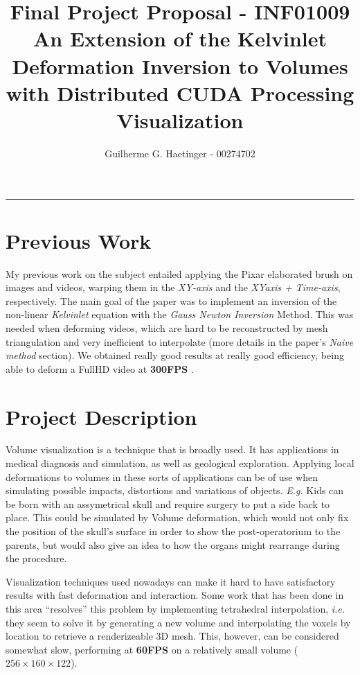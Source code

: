 \documentclass[11pt]{article}
\title{ Final Project Proposal - INF01009 \\ An Extension of the Kelvinlet Deformation
Inversion to Volumes with Distributed CUDA Processing Visualization }
\author{Guilherme G. Haetinger - 00274702}
\newcommand{\hl}{\noindent\rule{\textwidth}{0.5pt}}
\newcommand{\ie}{\textit{i.e. }}
\newcommand{\EG}{\textit{E.g. }}
\begin{document}
  \maketitle

  \hl

  \section*{Previous Work}
    My previous work on the subject entailed applying the Pixar elaborated brush
on images and videos, warping them in the \textit{XY-axis} and the
\textit{XYaxis + Time-axis}, respectively. The main goal of the paper was to implement
an inversion of the non-linear \textit{Kelvinlet} equation with the
\textit{Gauss Newton Inversion} Method. This was needed when deforming videos,
which are hard to be reconstructed by mesh triangulation and very inefficient to
interpolate (more details in the paper's \textit{Naive method} section). We obtained
really good results at really good efficiency, being able to deform a FullHD video
at \textbf{300FPS} \cite{haetinger2020regularized}.

  \section*{Project Description}

    Volume visualization is a technique that is broadly used. It has applications
in medical diagnosis and simulation, as well as geological exploration. Applying
local deformations to volumes in these sorts of applications can be of use when
simulating possible impacts, distortions and variations of objects. \EG Kids can
be born with an assymetrical skull and require surgery to put a side back to place.
This could be simulated by Volume deformation, which would not only fix the position
of the skull's surface in order to show the post-operatorium to the parents, but
would also give an idea to how the organs might rearrange during the procedure.

    Visualization techniques used nowadays can make it hard to have satisfactory
results with fast deformation and interaction. Some work \cite{Gascon2013} that
has been done in this area ``resolves'' this problem by implementing tetrahedral
interpolation, \ie they seem to solve it by generating a new volume and interpolating
the voxels by location to retrieve a renderizeable 3D mesh. This, however, can
be considered somewhat slow, performing at \textbf{60FPS} on a relatively small
volume ($256 \times 160 \times 122$).
\end{document}
